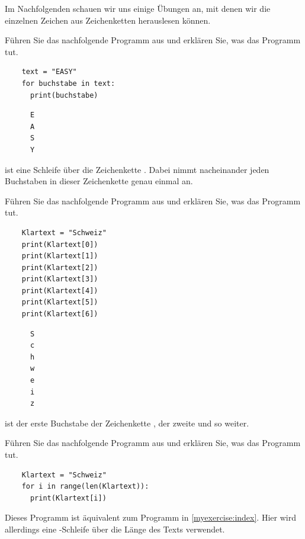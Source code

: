 Im Nachfolgenden schauen wir uns einige Übungen an, mit denen wir die einzelnen Zeichen aus Zeichenketten herauslesen können.

\begin{myexercise}
	Führen Sie das nachfolgende Programm aus und erklären Sie, was das Programm tut.
	\begin{lstlisting}
    text = "EASY"
    for buchstabe in text:
      print(buchstabe)
  \end{lstlisting}
	\begin{myanswer}
		\begin{lstlisting}
      E
      A
      S
      Y
    \end{lstlisting}
		 ist eine Schleife über die Zeichenkette . Dabei nimmt  nacheinander jeden Buchstaben in dieser Zeichenkette genau einmal an.
	\end{myanswer}
\end{myexercise}

\begin{myexercise}\label{myexercise:index}
	Führen Sie das nachfolgende Programm aus und erklären Sie, was das Programm tut.
	\begin{lstlisting}
    Klartext = "Schweiz"
    print(Klartext[0])
    print(Klartext[1])
    print(Klartext[2])
    print(Klartext[3])
    print(Klartext[4])
    print(Klartext[5])
    print(Klartext[6])
  \end{lstlisting}
	\begin{myanswer}
		\begin{lstlisting}
      S
      c
      h
      w
      e
      i
      z
    \end{lstlisting}
		 ist der erste Buchstabe der Zeichenkette ,  der zweite und so weiter.
	\end{myanswer}
\end{myexercise}

\begin{myexercise}
	Führen Sie das nachfolgende Programm aus und erklären Sie, was das Programm tut.
	\begin{lstlisting}
    Klartext = "Schweiz"
    for i in range(len(Klartext)):
      print(Klartext[i])
  \end{lstlisting}
	\begin{myanswer}
		Dieses Programm ist äquivalent zum Programm in \cref{myexercise:index}.
		Hier wird allerdings eine -Schleife über die Länge des Texts verwendet.
	\end{myanswer}
\end{myexercise}

